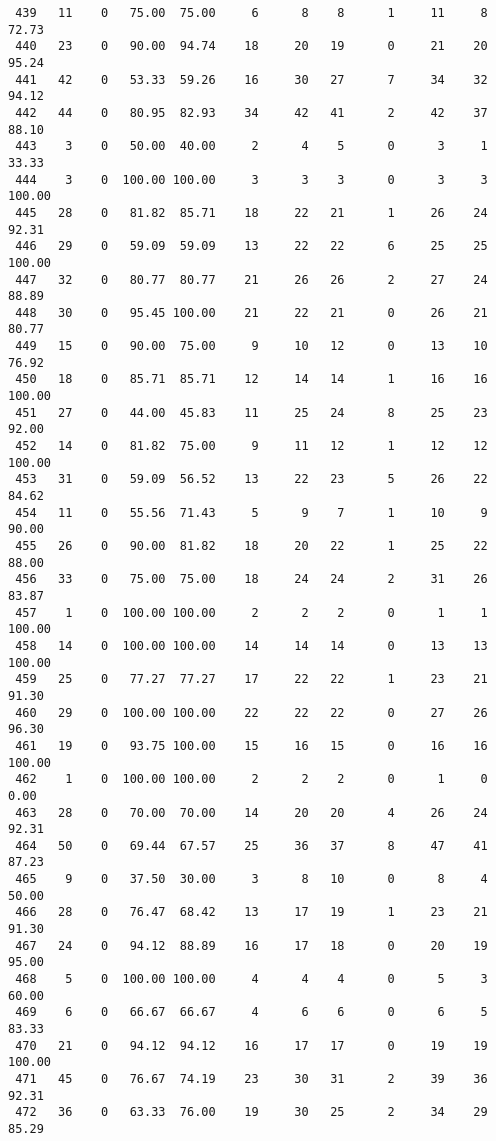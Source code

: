 \begin{verbatim}
 439   11    0   75.00  75.00     6      8    8      1     11     8    72.73
 440   23    0   90.00  94.74    18     20   19      0     21    20    95.24
 441   42    0   53.33  59.26    16     30   27      7     34    32    94.12
 442   44    0   80.95  82.93    34     42   41      2     42    37    88.10
 443    3    0   50.00  40.00     2      4    5      0      3     1    33.33
 444    3    0  100.00 100.00     3      3    3      0      3     3   100.00
 445   28    0   81.82  85.71    18     22   21      1     26    24    92.31
 446   29    0   59.09  59.09    13     22   22      6     25    25   100.00
 447   32    0   80.77  80.77    21     26   26      2     27    24    88.89
 448   30    0   95.45 100.00    21     22   21      0     26    21    80.77
 449   15    0   90.00  75.00     9     10   12      0     13    10    76.92
 450   18    0   85.71  85.71    12     14   14      1     16    16   100.00
 451   27    0   44.00  45.83    11     25   24      8     25    23    92.00
 452   14    0   81.82  75.00     9     11   12      1     12    12   100.00
 453   31    0   59.09  56.52    13     22   23      5     26    22    84.62
 454   11    0   55.56  71.43     5      9    7      1     10     9    90.00
 455   26    0   90.00  81.82    18     20   22      1     25    22    88.00
 456   33    0   75.00  75.00    18     24   24      2     31    26    83.87
 457    1    0  100.00 100.00     2      2    2      0      1     1   100.00
 458   14    0  100.00 100.00    14     14   14      0     13    13   100.00
 459   25    0   77.27  77.27    17     22   22      1     23    21    91.30
 460   29    0  100.00 100.00    22     22   22      0     27    26    96.30
 461   19    0   93.75 100.00    15     16   15      0     16    16   100.00
 462    1    0  100.00 100.00     2      2    2      0      1     0     0.00
 463   28    0   70.00  70.00    14     20   20      4     26    24    92.31
 464   50    0   69.44  67.57    25     36   37      8     47    41    87.23
 465    9    0   37.50  30.00     3      8   10      0      8     4    50.00
 466   28    0   76.47  68.42    13     17   19      1     23    21    91.30
 467   24    0   94.12  88.89    16     17   18      0     20    19    95.00
 468    5    0  100.00 100.00     4      4    4      0      5     3    60.00
 469    6    0   66.67  66.67     4      6    6      0      6     5    83.33
 470   21    0   94.12  94.12    16     17   17      0     19    19   100.00
 471   45    0   76.67  74.19    23     30   31      2     39    36    92.31
 472   36    0   63.33  76.00    19     30   25      2     34    29    85.29

\end{verbatim}

